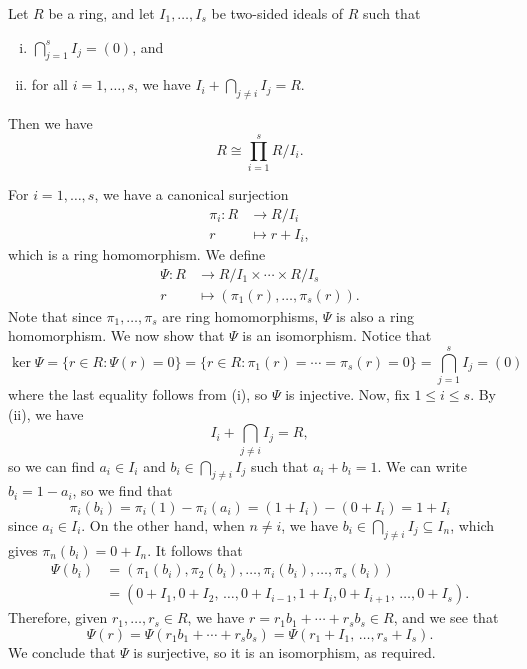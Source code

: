 \begin{thm}
Let $R$ be a ring, and let $I_1, \dots, I_s$ be two-sided ideals of $R$ such that 
\begin{enumerate}[(i)]
    \item $\bigcap_{j=1}^s I_j = (0)$, and 
    \item for all $i = 1, \dots, s$, we have $I_i + \bigcap_{j\neq i} I_j = R$. 
\end{enumerate}
Then we have 
\[ R \cong \prod_{i=1}^s R/I_i. \]
\end{thm}
\begin{pf}
For $i = 1, \dots, s$, we have a canonical surjection 
\begin{align*} \pi_i : R &\to R/I_i \\ r &\mapsto r + I_i, \end{align*}
which is a ring homomorphism. We define 
\begin{align*} \Psi : R &\to R/I_1 \times \cdots \times R/I_s \\ r &\mapsto (\pi_1(r), \dots, \pi_s(r)). 
\end{align*}
Note that since $\pi_1, \dots, \pi_s$ are ring homomorphisms, $\Psi$ is also a ring homomorphism. 
We now show that $\Psi$ is an isomorphism. Notice that 
\[ \ker\Psi = \{r \in R : \Psi(r) = 0\} = \{r \in R : \pi_1(r) = \cdots = \pi_s(r) = 0\} 
= \bigcap_{j=1}^s I_j = (0) \]
where the last equality follows from (i), so $\Psi$ is injective. Now, fix $1 \leq i \leq s$. 
By (ii), we have 
\[ I_i + \bigcap_{j\neq i} I_j = R, \]
so we can find $a_i \in I_i$ and $b_i \in \bigcap_{j\neq i} I_j$ such that $a_i + b_i = 1$. 
We can write $b_i = 1 - a_i$, so we find that 
\[ \pi_i(b_i) = \pi_i(1) - \pi_i(a_i) = (1 + I_i) - (0 + I_i) = 1 + I_i \]
since $a_i \in I_i$. 
On the other hand, when $n \neq i$, we have $b_i \in \bigcap_{j\neq i} I_j \subseteq I_n$, which 
gives $\pi_n(b_i) = 0 + I_n$. It follows that 
\begin{align*} \Psi(b_i) &= (\pi_1(b_i), \pi_2(b_i), \dots, \pi_i(b_i), \dots, \pi_s(b_i)) \\
&= (0 + I_1, 0 + I_2,\, \dots , 0 + I_{i-1}, 1 + I_i, 0 + I_{i+1},\, \dots, 0 + I_s). \end{align*}
Therefore, given $r_1, \dots, r_s \in R$, we have $r = r_1b_1 + \cdots + r_sb_s \in R$, and we see that
\[ \Psi(r) = \Psi(r_1b_1 + \cdots + r_sb_s) = \Psi(r_1 + I_1,\, \dots, r_s + I_s). \]
We conclude that $\Psi$ is surjective, so it is an isomorphism, as required. 
\end{pf}

